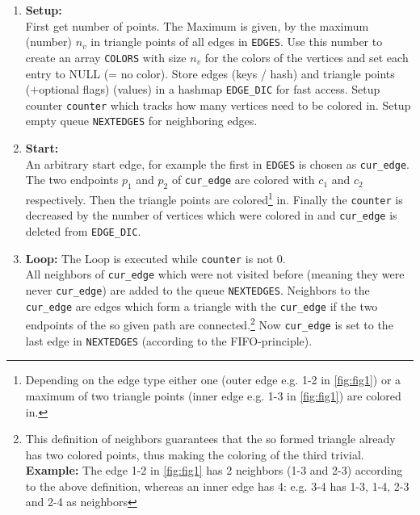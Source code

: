 \documentclass[english]{scrartcl}
\newcommand{\code}{\texttt}
\begin{document}
\begin{enumerate}
    \item \textbf{Setup:}\\ First get number of points. The Maximum is given, by the maximum (number) $n_v$ in triangle points of all edges in \code{EDGES}. Use this number to create an array \code{COLORS} with size $n_v$ for the colors of the vertices and set each entry to NULL (= no color). Store edges (keys / hash) and triangle points (+optional flags) (values) in a hashmap \code{EDGE\_DIC} for fast access. Setup counter \code{counter} which tracks how many vertices need to be colored in. Setup empty queue \code{NEXTEDGES} for neighboring edges.
    \item \textbf{Start:}\\ An arbitrary start edge, for example the first in \code{EDGES} is chosen as \code{cur\_edge}. The two endpoints $p_1$ and $p_2$ of \code{cur\_edge} are colored with $c_1$ and $c_2$ respectively. Then the triangle points are colored\footnote{Depending on the edge type either one (outer edge e.g. 1-2 in \autoref{fig:fig1}) or a maximum of two triangle points (inner edge e.g. 1-3 in \autoref{fig:fig1}) are colored in.} in. Finally the \code{counter} is decreased by the number of vertices which were colored in and \code{cur\_edge} is deleted from \code{EDGE\_DIC}.  
    \item \textbf{Loop:} The Loop is executed while \code{counter} is not 0. \\ All neighbors of \code{cur\_edge} which were not visited before (meaning they were never \code{cur\_edge}) are added to the queue \code{NEXTEDGES}. Neighbors to the \code{cur\_edge} are edges which form a triangle with the \code{cur\_edge} if the two endpoints of the so given path are connected.\footnote{This definition of neighbors guarantees that the so formed triangle already has two colored points, thus making the coloring of the third trivial. \\ \textbf{Example:} The edge 1-2 in \autoref{fig:fig1} has 2 neighbors (1-3 and 2-3) according to the above definition, whereas an inner edge has 4: e.g. 3-4 has 1-3, 1-4, 2-3 and 2-4 as neighbors} 
    Now \code{cur\_edge} is set to the last edge in \code{NEXTEDGES} (according to the FIFO-principle). %

\end{enumerate}
\end{document}
